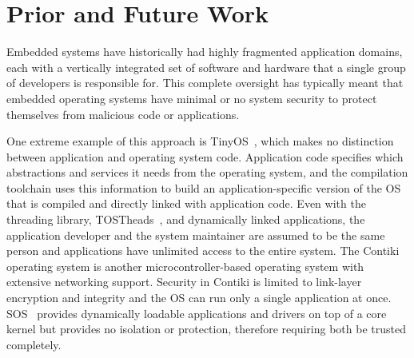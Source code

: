 \section{Prior and Future Work}

Embedded systems have historically had highly fragmented application domains,
each with a vertically integrated set of software and hardware
that a single group of developers
is responsible for.
This complete oversight has typically meant
that embedded operating systems have
minimal or no system security to protect themselves from malicious code
or applications.

One extreme example of this approach is TinyOS~\cite{tinyos}, which makes no
distinction between application and operating system code. Application
code specifies which abstractions and services it needs from the
operating system, and the compilation toolchain uses this information
to build an application-specific version of the OS that is compiled
and directly linked with application code.
Even with the threading library, TOSTheads~\cite{tosthreads}, and
dynamically linked applications, the
application
developer and the system maintainer are assumed to be the same person
and applications
have unlimited access to the entire system.
The Contiki~\cite{contiki} operating system is another microcontroller-based
operating system
with extensive networking support. Security in Contiki is limited to
link-layer encryption and integrity and the OS can run only a single
application at once. SOS~\cite{han05sos}
provides dynamically loadable applications  and drivers on top of a
core kernel but provides no isolation or protection, therefore requiring 
both be trusted completely.


